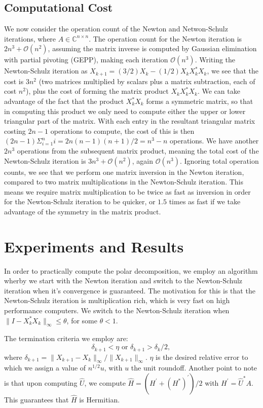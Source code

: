 \documentclass[12pt]{article}
\def\C{\mathbb{C}}
\def\nbyn{n \times n}
\def\normo#1{\|#1\|_{\infty}}
\begin{document}
\subsection{Computational Cost}
We now consider the operation count of the Newton and Netwon-Schulz iterations,
where $A \in \C^{\nbyn}$. The operation count for the Newton iteration is
$2n^3 + \mathcal{O}(n^2)$, assuming the matrix inverse is computed by Gaussian
elimination with partial pivoting (GEPP), making each iteration
$\mathcal{O}(n^3)$. Writing the Newton-Schulz iteration as
$X_{k+1} = (3/2)X_k - (1/2)X_kX_k^*X_k$, we see that the cost is $3n^2$ (two
matrices multiplied by scalars plus a matrix subtraction, each of cost $n^2$),
plus the cost of forming the matrix product $X_kX_k^*X_k$. We can take
advantage of the fact that the product $X_k^*X_k$ forms a symmetric matrix, so
that in computing this product we only need to compute either the upper or lower
triangular part of the matrix. With each entry in the resultant triangular
matrix costing $2n-1$ operations to compute, the cost of this is then
$(2n-1)\Sigma_{i=1}^n i = 2n(n-1)(n+1)/2 = n^3 - n$ operations. We have another
$2n^3$ operations from the subsequent matrix product, meaning the total cost of
the Newton-Schulz iteration is $3n^3 + \mathcal{O}(n^2)$, again
$\mathcal{O}(n^3)$. Ignoring total operation counts, we see that we perform one
matrix inversion in the Newton iteration, compared to two matrix multiplications
in the Newton-Schulz iteration. This means we require matrix multiplication to
be twice as fast as inversion in order for the Newton-Schulz iteration to be
quicker, or $1.5$ times as fast if we take advantage of the symmetry in the
matrix product.

\section{Experiments and Results}
In order to practically compute the polar decomposition, we employ an algorithm
wherby we start with the Newton iteration and switch to the Newton-Schulz
iteration when it's convergence is guaranteed. The motivation for this is that
the Newton-Schulz iteration is multiplication rich, which is very fast on high
performance computers. We switch to the Newton-Schulz iteration when
$\normo{I - X_k^*X_k} \leq \theta$, for some $\theta < 1$.

The termination criteria we employ are:
\begin{equation*}
  \delta_{k+1} < \eta \text{ or } \delta_{k+1} > \delta_k /2\text{, }
\end{equation*}
where $\delta_{k+1} = \normo{X_{k+1} - X_k}/\normo{X_{k+1}}$. $\eta$ is the
desired relative error to which we assign a value of $n^{1/2}u$, with $u$ the
unit roundoff. Another point to note is that upon computing $\hat{U}$, we
compute $\hat{H} = (H^{\prime} + (H^*)^{\prime})/2$ with
$H^{\prime} = \hat{U}^*A$. This guarantees that $\hat{H}$ is Hermitian.
\end{document}
